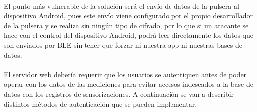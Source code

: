 \paragraph{}
El punto más vulnerable de la solución será el envío de datos de la pulsera al dispositivo Android, pues este envío viene configurado por el propio desarrollador de la pulsera y se realiza sin ningún tipo de cifrado, por lo que si un atacante se hace con el control del dispositivo Android, podrá leer directamente los datos que son enviados por BLE sin tener que forzar ni nuestra app ni nuestras bases de datos.

\paragraph{}
El servidor web debería requerir que los usuarios se autentiquen antes de poder operar con los datos de las mediciones para evitar accesos indeseados a la base de datos con los registros de sensorizaciones. A continuación se van a describir distintos métodos de autenticación que se pueden implementar.

